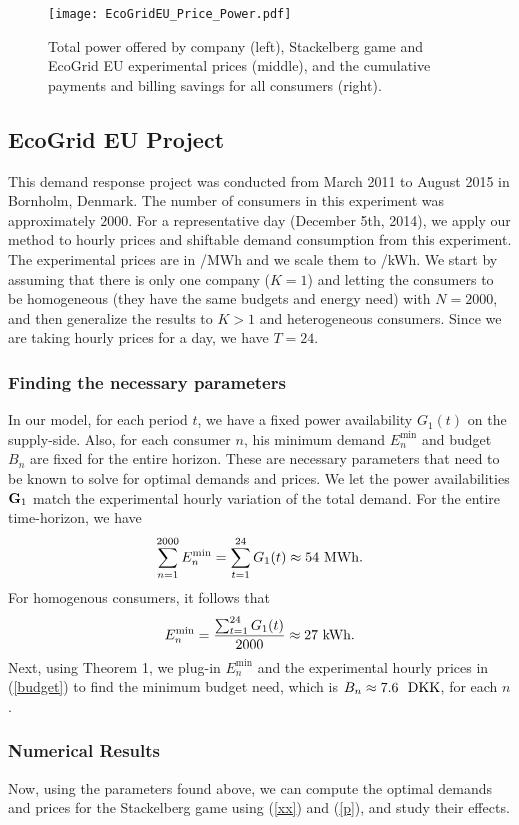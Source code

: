  \begin{figure*}
\centering
\texttt{[image: EcoGridEU\_Price\_Power.pdf]}
\caption{Total power offered by company (left), Stackelberg game and EcoGrid EU experimental prices (middle), and the cumulative payments and billing savings for all consumers (right). }
\label{EcoGridEU_Price_Power}
\end{figure*}


\subsection{EcoGrid EU Project} This demand response project was conducted from March 2011 to August 2015 in Bornholm, Denmark. The number of consumers in this experiment was approximately $2000$. For a representative day (December 5th, 2014), we apply our method to hourly prices and shiftable demand consumption from this experiment. The experimental prices are in  /MWh and we scale them to  /kWh. We start by assuming that there is only one company ($K=1$) and letting the consumers to be homogeneous (they have the same budgets and energy need) with $N=2000$, and then generalize the results to $K>1$ and heterogeneous consumers. Since we are taking hourly prices for a day, we have $T=24$. 

\subsubsection{Finding the necessary parameters}In our model, for each period $t$, we have a fixed power availability $G_1(t)$ on the supply-side. Also, for each consumer $n$, his minimum demand $E^{\min}_n$ and budget $B_n$ are fixed for the entire horizon. These are necessary parameters that need to be known to solve for optimal demands and prices. We let the power availabilities ${\bf G}_1$ match the experimental hourly variation of the total demand. For the entire time-horizon, we have  $$\sum^{2000}_{n=1} E^{\min}_n=\sum^{24}_{t=1}G_1(t) \approx 54 \ \text{{\color{blue}MWh}}.$$ For homogenous consumers, it follows that $$E^{\min}_n= \frac{\sum^{24}_{t=1}G_1(t)}{2000} \approx 27 \ \text{{\color{blue}kWh}}.$$ Next, using Theorem 1, we plug-in $E^{\min}_n$ and the experimental hourly prices in (\ref{budget}) to find the minimum budget need, which is $B_n\approx 7.6 \ \text{ \text{DKK}}$, for each $n$. 
   
 \subsubsection{Numerical Results} Now, using the parameters found above, we can compute the optimal demands and prices for the Stackelberg game using (\ref{xx}) and (\ref{p}), and study their effects. 
 
